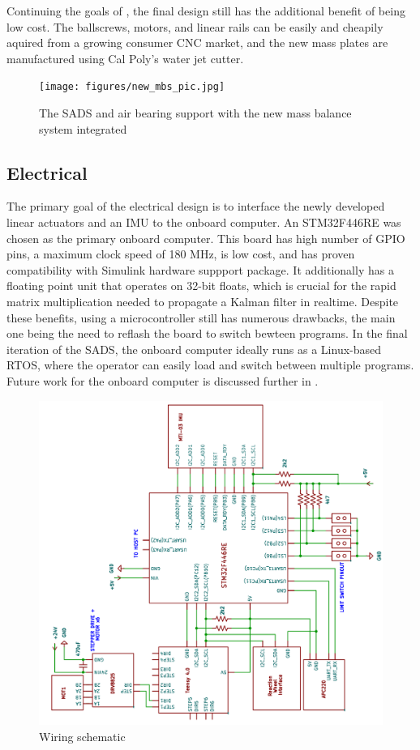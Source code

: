 Continuing the goals of \cite{gilman_automatic_2024}, the final design still has the additional benefit of being low cost. The ballscrews, motors, and linear rails can be easily and cheapily aquired from a growing consumer CNC market, and the new mass plates are manufactured using Cal Poly's water jet cutter.

\begin{figure}[h]
    \centering
    \texttt{[image: figures/new\_mbs\_pic.jpg]}
    \caption{The SADS and air bearing support with the new mass balance system integrated}
    \label{fig:new_mbs_pic}
\end{figure}

\subsection{Electrical}\label{sec:electrical}

The primary goal of the electrical design is to interface the newly developed linear actuators and an IMU to the onboard computer. An STM32F446RE was chosen as the primary onboard computer. This board has high number of GPIO pins, a maximum clock speed of 180 MHz, is low cost, and has proven compatibility with Simulink hardware suppport package. It additionally has a floating point unit that operates on 32-bit floats, which is crucial for the rapid matrix multiplication needed to propagate a Kalman filter in realtime. Despite these benefits, using a microcontroller still has numerous drawbacks, the main one being the need to reflash the board to switch bewteen programs. In the final iteration of the SADS, the onboard computer ideally runs as a Linux-based RTOS, where the operator can easily load and switch between multiple programs. Future work for the onboard computer is discussed further in .

\begin{figure}[h]\label{fig:wiring}
    \centering
    \includegraphics[width=\linewidth,angle=-90]{figures/wiring.png}
    \caption{Wiring schematic}
\end{figure}


